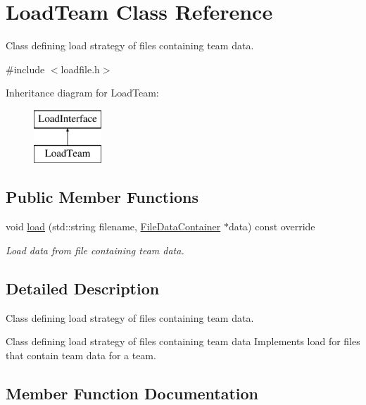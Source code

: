 \hypertarget{classLoadTeam}{}\section{Load\+Team Class Reference}
\label{classLoadTeam}


Class defining load strategy of files containing team data.  




{\ttfamily \#include $<$loadfile.\+h$>$}

Inheritance diagram for Load\+Team\+:\begin{figure}[H]
\begin{center}
\leavevmode
\includegraphics[height=2.000000cm]{classLoadTeam}
\end{center}
\end{figure}
\subsection*{Public Member Functions}
\begin{DoxyCompactItemize}
\item 
void \mbox{\hyperlink{classLoadTeam_ab91ac047be89f44e5011abca678fb077}{load}} (std\+::string filename, \mbox{\hyperlink{classFileDataContainer}{File\+Data\+Container}} $\ast$data) const override
\begin{DoxyCompactList}\small\item\em Load data from file containing team data. \end{DoxyCompactList}\end{DoxyCompactItemize}


\subsection{Detailed Description}
Class defining load strategy of files containing team data. 

Class defining load strategy of files containing team data Implements load for files that contain team data for a team. 

\subsection{Member Function Documentation}
\mbox{\label{classLoadTeam_ab91ac047be89f44e5011abca678fb077}} 
